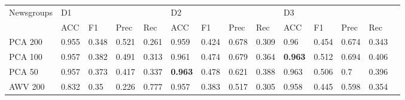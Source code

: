 
\begin{landscape}
\begin{table}[]
	\centering
	\scriptsize
	\begin{tabular}{llllllllllllll}
Newsgroups & D1                              &                  &                &                       & D2                              &                     &                    &      & D3                              &                &                &         &                    \\
& ACC                             & F1                              & Prec                            & Rec                             & ACC                             & F1                              & Prec                            & Rec                             & ACC                             & F1                              & Prec                            & Rec                             &                                 \\
PCA 200    & 0.955                           & 0.348                           & 0.521                           & 0.261                           & 0.959                           & 0.424                           & 0.678                           & 0.309                           & 0.96                            & 0.454                           & 0.674                           & 0.343                           &                                 \\
PCA 100    & 0.957                           & 0.382                           & 0.491                           & 0.313                           & 0.961                           & 0.474                           & 0.679                           & 0.364                           & \textbf{0.963} & 0.512                           & 0.694                           & 0.406                           &                                 \\
PCA 50     & 0.957                           & 0.373                           & 0.417                           & 0.337                           & \textbf{0.963} & 0.478                           & 0.621                           & 0.388                           & 0.963                           & 0.506                           & 0.7                             & 0.396                           &                                 \\
AWV 200    & 0.832                           & 0.35                            & 0.226                           & 0.777                           & 0.957                           & 0.383                           & 0.517                           & 0.305                           & 0.958                           & 0.445                           & 0.598                           & 0.354                           &                                 \\

\end{tabular}
\end{table}
\end{landscape}
